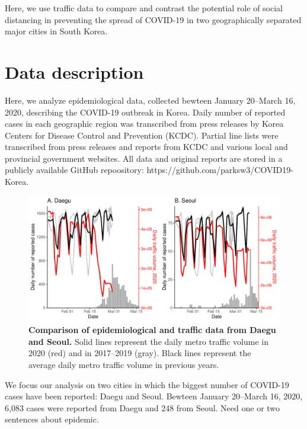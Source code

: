\documentclass[12pt]{article}
\date{\today}
\begin{document}
\begin{flushleft}{
	\Large
	\textbf{}
}
\end{flushleft}

\pagebreak

Here, we use traffic data to compare and contrast the potential role of social distancing in preventing the spread of COVID-19 in two geographically separated major cities in South Korea.

\section{Data description}

Here, we analyze epidemiological data, collected bewteen January 20--March 16, 2020, describing the COVID-19 outbreak in Korea.
Daily number of reported cases in each geographic region was transcribed from press releases by Korea Centers for Disease Control and Prevention (KCDC).
Partial line lists were transcribed from press releases and reports from KCDC and various local and provincial government websites.
All data and original reports are stored in a publicly available GitHub repoository: https://github.com/parksw3/COVID19-Korea.

\begin{figure}[!h]
\includegraphics[width=\textwidth]{figure_compare_report.pdf}
\caption{
\textbf{Comparison of epidemiological and traffic data from Daegu and Seoul.}
Solid lines represent the daily metro traffic volume in 2020 (red) and in 2017--2019 (gray).
Black lines represent the average daily metro traffic volume in previous years.
}
\label{fig:data}
\end{figure}

We focus our analysis on two cities in which the biggest number of COVID-19 cases have been reported: Daegu and Seoul.
Bewteen January 20--March 16, 2020, 6,083 cases were reported from Daegu and 248 from Seoul.
Need one or two sentences about epidemic.
\end{document}
